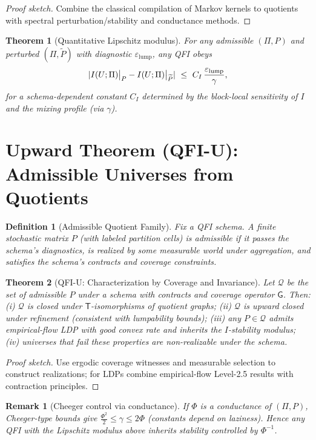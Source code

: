 \documentclass[11pt]{article}
\newcommand{\gap}{\gamma}             %
\newcommand{\1}{\mathbf{1}}
\DeclarePairedDelimiter{\abs}{\lvert}{\rvert}
\newtheorem{defn}{Definition}
\newtheorem{thm}{Theorem}
\newtheorem{remark}{Remark}             %
\begin{document}
\begin{proof}[Proof sketch]
Combine the classical compilation of Markov kernels to quotients with spectral perturbation/stability and conductance methods\cite{Chung1997,JerrumSinclair1989}.
\end{proof}

\begin{thm}[Quantitative Lipschitz modulus]
For any admissible $(\Pi,P)$ and perturbed $(\Pi,\widetilde P)$ with diagnostic $\varepsilon_{\mathrm{lump}}$, any QFI obeys
\[
\abs{I(U;\Pi)\big|_{P}-I(U;\Pi)\big|_{\widetilde P}}\ \le\ C_I\,\frac{\varepsilon_{\mathrm{lump}}}{\gap},
\]
for a schema-dependent constant $C_I$ determined by the block-local sensitivity of $I$ and the mixing profile (via $\gap$)\cite{Chung1997,Mitrophanov2005}.
\end{thm}

\section{Upward Theorem (QFI-U): Admissible Universes from Quotients}
\begin{defn}[Admissible Quotient Family]
Fix a QFI schema. A finite stochastic matrix $P$ (with labeled partition cells) is \emph{admissible} if it passes the schema's diagnostics, is realized by some measurable world under aggregation, and satisfies the schema's contracts and coverage constraints.
\end{defn}

\begin{thm}[QFI-U: Characterization by Coverage and Invariance]
Let $\mathcal Q$ be the set of admissible $P$ under a schema with contracts and coverage operator $\mathsf G$. Then:
(i) $\mathcal Q$ is closed under $\mathsf T$-isomorphisms of \emph{quotient graphs}\cite{HammackImrichKlavzar2011};
(ii) $\mathcal Q$ is upward closed under refinement (consistent with lumpability bounds);
(iii) any $P\in\mathcal Q$ admits empirical-flow LDP with good convex rate and inherits the $I$-stability modulus;
(iv) universes that fail these properties are non-realizable under the schema.
\end{thm}

\begin{proof}[Proof sketch]
Use ergodic coverage witnesses and measurable selection to construct realizations; for LDPs combine empirical-flow Level-2.5 results with contraction principles.
\end{proof}

\begin{remark}[Cheeger control via conductance]
If $\Phi$ is a conductance of $(\Pi,P)$, Cheeger-type bounds give $\tfrac{\Phi^2}{2}\le \gap \le 2\Phi$ (constants depend on laziness)\cite{Chung1997}.
Hence any QFI with the Lipschitz modulus above inherits stability controlled by $\Phi^{-1}$.
\end{remark}
\end{document}
